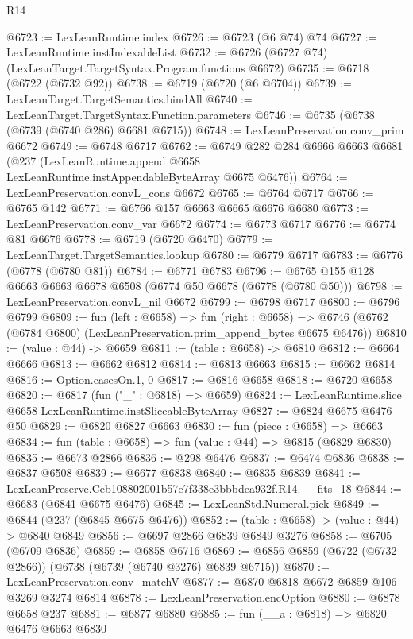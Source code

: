 \begin{lexlean}{R14}
\begin{coremodule}
@6723 := LexLeanRuntime.index
@6726 := @6723 (@6 @74) @74
@6727 := LexLeanRuntime.instIndexableList
@6732 := @6726 (@6727 @74) (LexLeanTarget.TargetSyntax.Program.functions @6672)
@6735 := @6718 (@6722 (@6732 @92))
@6738 := @6719 (@6720 (@6 @6704))
@6739 := LexLeanTarget.TargetSemantics.bindAll
@6740 := LexLeanTarget.TargetSyntax.Function.parameters
@6746 := @6735 (@6738 (@6739 (@6740 @286) @6681 @6715))
@6748 := LexLeanPreservation.conv_prim @6672
@6749 := @6748 @6717
@6762 := @6749
    @282
    @284
    @6666
    @6663
    @6681
    (@237 (LexLeanRuntime.append @6658 LexLeanRuntime.instAppendableByteArray @6675 @6476))
@6764 := LexLeanPreservation.convL_cons @6672
@6765 := @6764 @6717
@6766 := @6765 @142
@6771 := @6766 @157 @6663 @6665 @6676 @6680
@6773 := LexLeanPreservation.conv_var @6672
@6774 := @6773 @6717
@6776 := @6774 @81 @6676
@6778 := @6719 (@6720 @6470)
@6779 := LexLeanTarget.TargetSemantics.lookup
@6780 := @6779 @6717
@6783 := @6776 (@6778 (@6780 @81))
@6784 := @6771 @6783
@6796 := @6765 @155 @128 @6663 @6663 @6678 @6508 (@6774 @50 @6678 (@6778 (@6780 @50)))
@6798 := LexLeanPreservation.convL_nil @6672
@6799 := @6798 @6717
@6800 := @6796 @6799
@6809 := fun (left : @6658) =>
  fun (right : @6658) =>
  @6746 (@6762 (@6784 @6800) (LexLeanPreservation.prim_append_bytes @6675 @6476))
@6810 := (value : @44) -> @6659
@6811 := (table : @6658) -> @6810
@6812 := @6664 @6666
@6813 := @6662 @6812
@6814 := @6813 @6663
@6815 := @6662 @6814
@6816 := Option.casesOn.{1, 0}
@6817 := @6816 @6658
@6818 := @6720 @6658
@6820 := @6817 (fun ("_" : @6818) => @6659)
@6824 := LexLeanRuntime.slice @6658 LexLeanRuntime.instSliceableByteArray
@6827 := @6824 @6675 @6476 @50
@6829 := @6820 @6827 @6663
@6830 := fun (piece : @6658) => @6663
@6834 := fun (table : @6658) => fun (value : @44) => @6815 (@6829 @6830)
@6835 := @6673 @2866
@6836 := @298 @6476
@6837 := @6474 @6836
@6838 := @6837 @6508
@6839 := @6677 @6838
@6840 := @6835 @6839
@6841 := LexLeanPreserve.Ceb108802001b57e7f338e3bbbdea932f.R14.__fits_18
@6844 := @6683 (@6841 @6675 @6476)
@6845 := LexLeanStd.Numeral.pick
@6849 := @6844 (@237 (@6845 @6675 @6476))
@6852 := (table : @6658) -> (value : @44) -> @6840 @6849
@6856 := @6697 @2866 @6839 @6849 @3276
@6858 := @6705 (@6709 @6836)
@6859 := @6858 @6716
@6869 := @6856 @6859 (@6722 (@6732 @2866)) (@6738 (@6739 (@6740 @3276) @6839 @6715))
@6870 := LexLeanPreservation.conv_matchV
@6877 := @6870 @6818 @6672 @6859 @106 @3269 @3274 @6814
@6878 := LexLeanPreservation.encOption
@6880 := @6878 @6658 @237
@6881 := @6877 @6880
@6885 := fun (__a : @6818) => @6820 @6476 @6663 @6830

\end{coremodule}
\end{lexlean}
